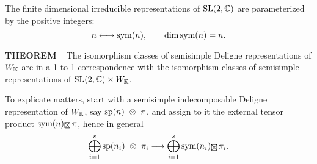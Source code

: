 \vspace{0.1cm}

The finite dimensional irreducible representations of $\text{SL}(2,\mathbb{C})$ are parameterized by the positive integers:
\[
n \longleftrightarrow \text{sym}(n), \qquad \dim \text{sym}(n) = n.
\]

\vspace{0.1cm}

\begin{x}{\small\bf THEOREM} \ %
The isomorphism classes of semisimple Deligne representations of $W_{\mathbb{K}}$ are in a 1-to-1 correspondence with the isomorphism classes of semisimple representations of $\text{SL}(2,\mathbb{C}) \times W_{\mathbb{K}}$.
\end{x}

\vspace{0.1cm}

To explicate matters, start with a semisimple indecomposable Deligne representation of $W_{\mathbb{K}}$, say 
$\text{sp}(n) \ \otimes \  \pi$, and assign to it the external tensor product 
\fboxsep=0cm
$\sym(n)  \boxtimesdmc \hsx \pi$, hence in general 
\[
\bigoplus\limits_{i = 1}^s \spp(n_i)  \ \otimes \  \pi_i \lra 
\bigoplus\limits_{i = 1}^s \sym(n_i) \boxtimesdmc \hsx \pi_i.
\] 





















